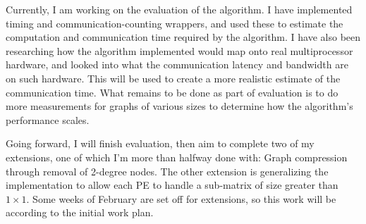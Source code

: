 \documentclass[11pt]{article}
\begin{document}
Currently, I am working on the evaluation of the algorithm. I have implemented
timing and communication-counting wrappers, and used these to estimate the
computation and communication time required by the algorithm. I have also been
researching how the algorithm implemented would map onto real multiprocessor
hardware, and looked into what the communication latency and bandwidth are on such
hardware. This will be used to create a more realistic estimate of the
communication time. What remains to be done as part of evaluation is to do more
measurements for graphs of various sizes to determine how the
algorithm's performance scales.

Going forward, I will finish evaluation, then aim to complete two of my
extensions, one of which I'm more than halfway done with: Graph compression
through removal of 2-degree nodes.  The other extension is generalizing the
implementation to allow each PE to handle a sub-matrix of size greater than $1
\times 1$.  Some weeks of February are set off for extensions, so this work will
be according to the initial work plan.  
\end{document}
